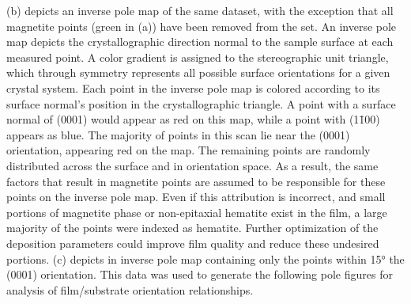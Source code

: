 (b) depicts an inverse pole map of the same dataset, with the exception
that all magnetite points (green in (a)) have been removed from the
set. An inverse pole map depicts the crystallographic direction normal to the sample
surface at each measured point. A color gradient is assigned to the stereographic unit
triangle, which through symmetry represents all possible surface orientations for a given
crystal system. Each point in the inverse pole map is colored according to its surface
normal's position in the crystallographic triangle. A point with a surface normal of
(0001) would appear as red on this map, while a point with (1\={1}00) appears as blue. The
majority of points in this scan lie near the (0001) orientation, appearing red on the map.
The remaining points are randomly distributed across the surface and in orientation space.
As a result, the same factors that result in magnetite points are assumed to be
responsible for these points on the inverse pole map. Even if this attribution is
incorrect, and small portions of magnetite phase or non-epitaxial hematite exist in the
film, a large majority of the points were indexed as hematite. Further optimization of the
deposition parameters could improve film quality and reduce these undesired portions.
(c) depicts in inverse pole map containing only the points within
15\si{\degree} the (0001) orientation. This data was used to generate the following pole
figures for analysis of film/substrate orientation relationships.

